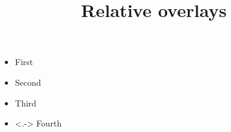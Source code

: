 \documentclass{ltx-talk}
\title{Relative overlays}
\begin{document}
\begin{frame}
  \begin{itemize}[<+->]
    \item First
    \item Second
    \item Third
    \item<.-> Fourth
  \end{itemize}
\end{frame}
\end{document}
